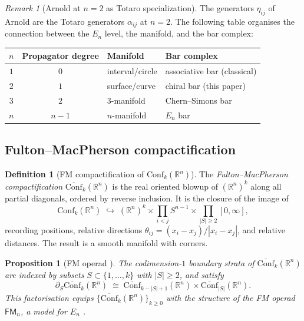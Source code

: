 \documentclass[11pt,reqno]{amsart}
\newtheorem{proposition}[theorem]{Proposition}
\theoremstyle{definition}
\newtheorem{definition}[theorem]{Definition}
\theoremstyle{remark}
\newtheorem{remark}[theorem]{Remark}
\providecommand{\Conf}{\mathrm{Conf}}
\providecommand{\En}{E_n}
\providecommand{\bR}{\mathbb{R}}
\begin{document}
\begin{remark}[Arnold at $n = 2$ as Totaro specialization]
\label{rem:e-arnold-totaro}
The generators $\eta_{ij}$ of Arnold are the Totaro generators
$\alpha_{ij}$ at $n = 2$. The following table organises the
connection between the $\En$ level, the manifold, and the bar
complex:
\begin{center}
\renewcommand{\arraystretch}{1.15}
\begin{tabular}{ccll}
$n$ & Propagator degree & Manifold & Bar complex \\
\hline
$1$ & $0$ & interval/circle & associative bar (classical) \\
$2$ & $1$ & surface/curve & chiral bar (this paper) \\
$3$ & $2$ & $3$-manifold & Chern--Simons bar \\
$n$ & $n{-}1$ & $n$-manifold & $\En$ bar
\end{tabular}
\end{center}
\end{remark}

\subsection{Fulton--MacPherson compactification}

\begin{definition}[FM compactification of $\Conf_k(\bR^n)$]
\label{def:e-fm-rn}
The \emph{Fulton--MacPherson compactification}
$\overline{\Conf}_k(\bR^n)$ is the real oriented blowup
of $(\bR^n)^k$ along all partial diagonals, ordered by reverse
inclusion. It is the closure of the image of
\[
\Conf_k(\bR^n) \;\hookrightarrow\;
(\bR^n)^k \times \prod_{i<j} S^{n-1}
\times \prod_{|S| \ge 2} [0,\infty],
\]
recording positions, relative directions
$\theta_{ij} = (x_i - x_j)/|x_i - x_j|$, and relative
distances. The result is a smooth manifold with corners.
\end{definition}

\begin{proposition}[FM operad \textup{\cite{FultonMacPherson94}}]
\label{prop:e-fm-operad}
The codimension-$1$ boundary strata of
$\overline{\Conf}_k(\bR^n)$ are indexed by subsets
$S \subset \{1,\ldots,k\}$ with $|S| \ge 2$, and satisfy
\[
\partial_S\overline{\Conf}_k(\bR^n)
\;\cong\;
\overline{\Conf}_{k - |S| + 1}(\bR^n)
\times
\overline{\Conf}_{|S|}(\bR^n).
\]
This factorisation equips
$\{\overline{\Conf}_k(\bR^n)\}_{k \ge 0}$ with the structure
of the FM operad $\mathsf{FM}_n$, a model for $\En$
\textup{\cite{GJ,SalvatoreLongoni05}}.
\end{proposition}
\end{document}
